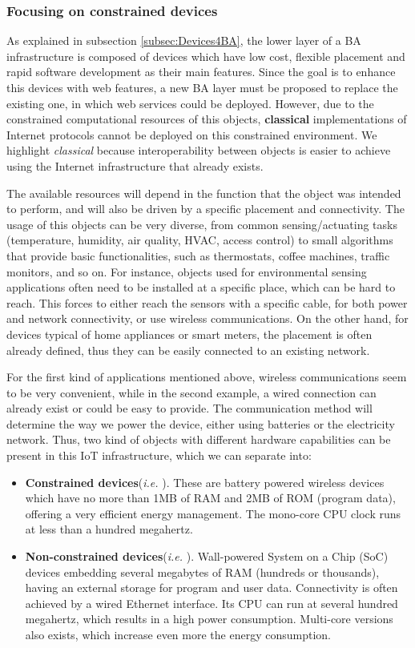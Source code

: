 \subsubsection{Focusing on constrained devices}
\label{subsec:constrainedObj}
As explained in subsection \ref{subsec:Devices4BA}, the lower layer of a BA infrastructure is composed of devices which have low cost, flexible placement and rapid software development as their main features.
Since the goal is to enhance this devices with web features, a new BA layer must be proposed to replace the existing one, in which web services could be deployed.
However, due to the constrained computational resources of this objects, \textbf{classical} implementations of Internet protocols cannot be deployed on this constrained environment.
We highlight \textit{classical} because interoperability between objects is easier to achieve using the Internet infrastructure that already exists.

The available resources will depend in the function that the object was intended to perform, and will also be driven by a specific placement and connectivity.
The usage of this objects can be very diverse, from common sensing/actuating tasks (temperature, humidity, air quality, HVAC, access control) to small algorithms that provide basic functionalities, such as thermostats, coffee machines, traffic monitors, and so on.
For instance, objects used for environmental sensing applications often need to be installed at a specific place\cite{younis2008placement}, which can be hard to reach. 
This forces to either reach the sensors with a specific cable, for both power and network connectivity, or use wireless communications.
On the other hand, for devices typical of home appliances or smart meters, the placement is often already defined, thus they can be easily connected to an existing network.

For the first kind of applications mentioned above, wireless communications seem to be very convenient, while in the second example, a wired connection can already exist or could be easy to provide.
The communication method will determine the way we power the device, either using batteries or the electricity network.
Thus, two kind of objects with different hardware capabilities can be present in this IoT infrastructure, which we can separate into:

\begin{itemize}
	\item \textbf{Constrained devices}(\textit{i.e.} \cite{RPi}). These are battery powered wireless devices which have no more than 1MB of RAM and 2MB of ROM (program data), offering a very efficient energy management. The mono-core CPU clock runs at less than a hundred megahertz.
	\item \textbf{Non-constrained devices}(\textit{i.e.} \cite{iotlab-m3}). Wall-powered System on a Chip (SoC) devices embedding several megabytes of RAM (hundreds or thousands), having an external storage for program and user data. Connectivity is often achieved by a wired Ethernet interface. Its CPU can run at several hundred megahertz, which results in a high power consumption. Multi-core versions also exists, which increase even more the energy consumption.
\end{itemize}

